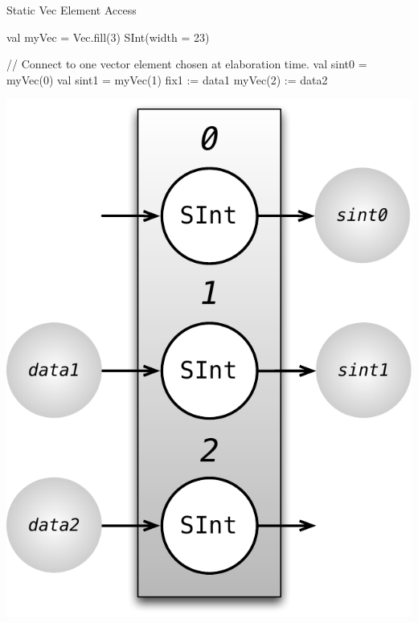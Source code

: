 \documentclass[xcolor=pdflatex,dvipsnames,table]{beamer}
\begin{document}
\begin{frame}[fragile]{Static Vec Element Access}
\begin{scala}
val myVec = Vec.fill(3) { SInt(width = 23) } 

// Connect to one vector element chosen at elaboration time.
val sint0 = myVec(0)
val sint1 = myVec(1)
fix1     := data1 
myVec(2) := data2
\end{scala}

\begin{center}
\includegraphics[height=0.5\textheight]{figs/vec-3-static.pdf} 
\end{center}
\end{frame}
\end{document}
